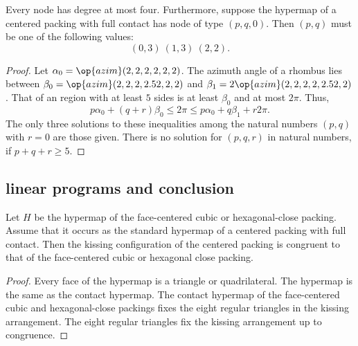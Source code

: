 \begin{lemma}\label{lemma:no-5} 
  Every node has degree at most four.  Furthermore, suppose the
  hypermap of a centered packing with full contact has node of type
  $(p,q,0)$.  Then $(p,q)$ must be one of the following values:
\begin{displaymath}
(0,3)~(1,3)~(2,2).
\end{displaymath}
\end{lemma}

\begin{proof} Let $\alpha_0 = \op{azim}(2,2,2,2,2,2)$.  The azimuth
  angle of a rhombus lies between $\beta_0 =
  \op{azim}(2,2,2,2.52,2,2)$ and $\beta_1 =
  2\op{azim}(2,2,2,2,2.52,2)$.  That of an region with at least $5$
  sides is at least $\beta_0$ and at most $2\pi$.  Thus,
\begin{displaymath}
p\alpha_0 + (q+r) \beta_0 \le 2\pi \le p\alpha_0 + q\beta_1 + r 2\pi.
\end{displaymath}
The only three solutions to these inequalities among the natural
numbers $(p,q)$ with $r=0$ are those given. There is no solution for
$(p,q,r)$ in natural numbers, if $p+q+r\ge 5$.
\end{proof}





\subsection{linear programs and conclusion}

\begin{lemma}\label{lemma:kiss-fcc} Let $H$ be the
  hypermap of the face-centered cubic or hexagonal-close packing.
  Assume that it occurs as the standard hypermap of a centered packing
  with full contact.  Then the kissing configuration of the centered
  packing is congruent to that of the face-centered cubic or hexagonal
  close packing.
\end{lemma}
%
%
%
%
%

\begin{proof} Every face of the hypermap is a triangle or
  quadrilateral.  The hypermap is the same as the contact hypermap.
  The contact hypermap of the face-centered cubic and hexagonal-close
  packings fixes the eight regular triangles in the kissing
  arrangement.  The eight regular triangles fix the kissing
  arrangement up to congruence.
\end{proof}

